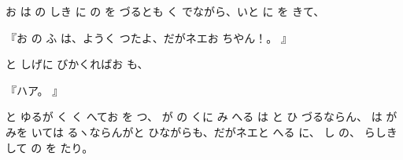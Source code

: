 
お
は
の
しき
に
の
を
づるとも
く
でながら、いと
に
を
きて、

『お
の
ふ
は、ようく
つたよ、だがネエお
ちやん！。
』

と
しげに
びかくればお
も、

『ハア。
』

と
ゆるが
く
く
へてお
を
つ、
が
の
くに
み
へる
は
と
ひ
づるならん、
は
が
みを
いては
るヽならんがと
ひながらも、だがネエと
へる
に、
し
の、
らしき
して
の
を
たり。


